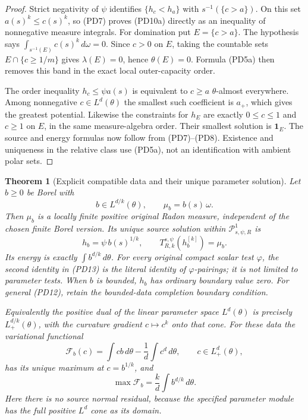 \documentclass[11pt,a4paper]{article}
\numberwithin{equation}{section}
\newtheorem{theorem}{Theorem}[section]
\theoremstyle{definition}
\theoremstyle{remark}
\begin{document}
\begin{proof}
Strict negativity of $\psi$ identifies
$\{h_c<h_a\}$ with $s^{-1}(\{c>a\})$. On this set
$a(s)^k\leq c(s)^k$, so (PD7) proves (PD10a) directly
as an inequality of nonnegative measure integrals.
For domination put $E=\{c>a\}$. The hypothesis says
$\int_{s^{-1}(E)}c(s)^k\,d\omega=0$.
Since $c>0$ on $E$, taking the countable sets $E\cap\{c\geq1/m\}$
gives $\lambda(E)=0$, hence $\theta(E)=0$. Formula (PD5a)
then removes this band in the exact local outer-capacity order.

The order inequality $h_c\leq\psi a(s)$ is equivalent to
$c\geq a$ $\theta$-almost everywhere. Among nonnegative
$c\in L^d(\theta)$ the smallest such coefficient is $a_+$,
which gives the greatest potential. Likewise the constraints
for $h_E$ are exactly $0\leq c\leq1$ and $c\geq1$ on $E$,
in the same measure-algebra order. Their smallest solution is
$\mathbf1_E$. The source and energy formulas now follow from
(PD7)--(PD8). Existence and uniqueness in the relative class
use (PD5a), not an identification with ambient polar sets.
\end{proof}

\begin{theorem}[Explicit compatible data and their unique parameter solution]
\label{thm:r12-parameter-Dirichlet}
Let $b\geq0$ be Borel with
\[
                             b\in L^{d/k}(\theta),
 \qquad \mu_b=b(s)\,\omega.
 \tag{PD12}
\]
Then $\mu_b$ is a locally finite positive original Radon
measure, independent of the chosen finite Borel version.
Its unique source solution within
$\mathscr P^1_{s,\psi,R}$ is
\[
                         h_b=\psi\,b(s)^{1/k},\qquad
                  T^{s,\psi}_{R,k}(h_b^{[k]})=\mu_b.
 \tag{PD13}
\]
Its energy is exactly $\int b^{d/k}\,d\theta$.
For every original compact scalar test $\varphi$,
the second identity in (PD13) is the literal identity
of $\varphi$-pairings; it is not limited to parameter
tests. When $b$ is bounded, $h_b$ has ordinary boundary
value zero. For general (PD12), retain the bounded-data
completion boundary condition.

Equivalently the positive dual of the linear parameter
space $L^d(\theta)$ is precisely $L^{d/k}_+(\theta)$,
with the curvature gradient $c\mapsto c^k$ onto that
cone. For these data the variational functional
\[
             \mathcal F_b(c)=\int cb\,d\theta
                                  -\frac{1}{d}\int c^d\,d\theta,
                         \qquad c\in L^d_+(\theta),
 \tag{PD14}
\]
has its unique maximum at $c=b^{1/k}$, and
\[
                    \max\mathcal F_b=\frac{k}{d}\int b^{d/k}\,d\theta.
 \tag{PD15}
\]
Here there is no source normal residual, because the
specified parameter module has the full positive
$L^d$ cone as its domain.
\end{theorem}
\end{document}
